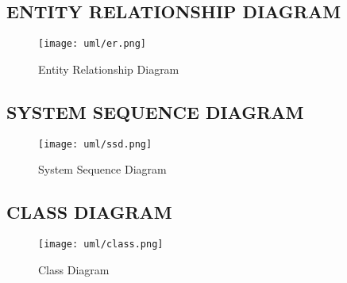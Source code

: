 \subsection{ENTITY RELATIONSHIP DIAGRAM}
\lipsum[4]
\begin{figure}[h!]
	\begin{center}
		\texttt{[image: uml/er.png]}
	\end{center}
	\caption{Entity Relationship Diagram}
\end{figure}

\subsection{SYSTEM SEQUENCE DIAGRAM}
\lipsum[4]
\begin{figure}[h!]
	\begin{center}
		\texttt{[image: uml/ssd.png]}
	\end{center}
	\caption{System Sequence Diagram}
\end{figure}

\subsection{CLASS DIAGRAM}
\lipsum[4]
\begin{figure}[h!]
	\begin{center}
		\texttt{[image: uml/class.png]}
	\end{center}
	\caption{Class Diagram}
\end{figure}